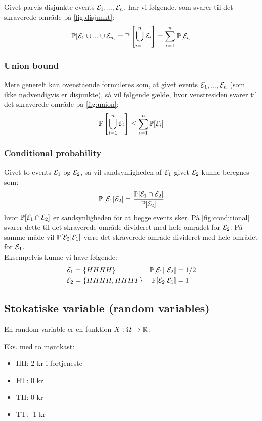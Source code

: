 Givet parvis disjunkte events ${\mathcal{E}}_1, ..., {\mathcal{E}}_n$, har vi følgende, som svarer til det skraverede område på \ref{fig:disjunkt}:
\begin{align} \label{eq:disjunkt}
{\mathbb P}[{\mathcal{E}}_1 \cup ... \cup {\mathcal{E}}_n] = {\mathbb P} \left[ \bigcup_{i=1}^n {\mathcal{E}}_i \right] = \sum_{i=1}^{n} {\mathbb P}[{\mathcal{E}}_i]
\end{align}

\subsubsection{Union bound}
Mere generelt kan ovenstående formuleres som, at givet events ${\mathcal{E}}_1, ..., {\mathcal{E}}_n$ (som ikke nødvendigvis er disjunkte), så vil følgende gælde, hvor venstresiden svarer til det skraverede område på \ref{fig:union}:
\begin{align} \label{eq:union-bound}
{\mathbb P} \left[ \bigcup_{i=1}^n {\mathcal{E}}_i \right] \leq \sum_{i=1}^{n} {\mathbb P}[{\mathcal{E}}_i]
\end{align}

\subsubsection{Conditional probability}
Givet to events ${\mathcal{E}}_1$ og ${\mathcal{E}}_2$, så vil sandsynligheden af ${\mathcal{E}}_1$ givet ${\mathcal{E}}_2$ kunne beregnes som:
\begin{align}
{\mathbb P} \left[ {\mathcal{E}}_1 | {\mathcal{E}}_2 \right] = \frac{{\mathbb P}[{\mathcal{E}}_1 \cap {\mathcal{E}}_2]}{{\mathbb P}[{\mathcal{E}}_2]}
\end{align}
hvor ${\mathbb P}[{\mathcal{E}}_1 \cap {\mathcal{E}}_2]$ er sandsynligheden for at begge events sker. På \ref{fig:conditional} svarer dette til det skraverede område divideret med hele området for ${\mathcal{E}}_2$. På samme måde vil ${\mathbb P}[{\mathcal{E}}_2 | {\mathcal{E}}_1]$ være det skraverede område divideret med hele området for ${\mathcal{E}}_1$.\\

Eksempelvis kunne vi have følgende:
\begin{align*}
\E_1 &= \curly{HHHH}       &\P[\E_1 | \E_2] &= 1/2\\
\E_2 &= \curly{HHHH, HHHT} &\P[\E_2 | \E_1] &= 1
\end{align*}

\subsection{Stokatiske variable (random variables)}
En random variable er en funktion $X: \Omega \rightarrow {\mathbb R}$:

Eks. med to møntkast:
\begin{itemize}
	\item HH: 2 kr i fortjeneste
	\item HT: 0 kr
	\item TH: 0 kr
	\item TT: -1 kr
\end{itemize}

